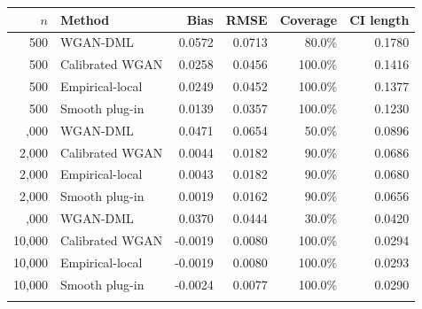 \begin{tabular}{rlrrrr}
\toprule
$n$ & Method & Bias & RMSE & Coverage & CI length \\
\midrule
500 & WGAN-DML & 0.0572 & 0.0713 & 80.0\% & 0.1780 \\
500 & Calibrated WGAN & 0.0258 & 0.0456 & 100.0\% & 0.1416 \\
500 & Empirical-local & 0.0249 & 0.0452 & 100.0\% & 0.1377 \\
500 & Smooth plug-in & 0.0139 & 0.0357 & 100.0\% & 0.1230 \\
\addlinespace
2,000 & WGAN-DML & 0.0471 & 0.0654 & 50.0\% & 0.0896 \\
2,000 & Calibrated WGAN & 0.0044 & 0.0182 & 90.0\% & 0.0686 \\
2,000 & Empirical-local & 0.0043 & 0.0182 & 90.0\% & 0.0680 \\
2,000 & Smooth plug-in & 0.0019 & 0.0162 & 90.0\% & 0.0656 \\
\addlinespace
10,000 & WGAN-DML & 0.0370 & 0.0444 & 30.0\% & 0.0420 \\
10,000 & Calibrated WGAN & -0.0019 & 0.0080 & 100.0\% & 0.0294 \\
10,000 & Empirical-local & -0.0019 & 0.0080 & 100.0\% & 0.0293 \\
10,000 & Smooth plug-in & -0.0024 & 0.0077 & 100.0\% & 0.0290 \\
\addlinespace
\bottomrule
\end{tabular}
